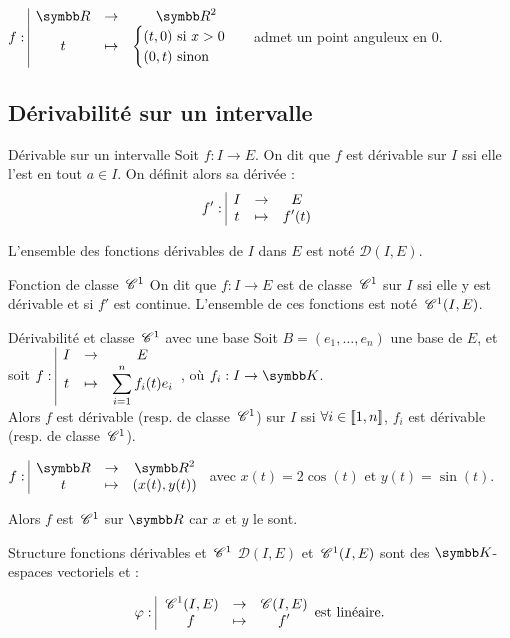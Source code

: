 \begin{exemple}
    $\fonction f \R {\R^2} t {\begin{cases} (t, 0)~\text{si}~x > 0\\(0,t)~\text{sinon}\end{cases}}$ admet un point anguleux en $0$.
\end{exemple}

\subsection{Dérivabilité sur un intervalle}

\begin{definition}{Dérivable sur un intervalle}{}
    Soit $f : I \to E$. On dit que $f$ est dérivable sur $I$ ssi elle l'est en tout $a \in I$. 
    On définit alors sa dérivée :
    \[f': \space \begin{array}{|ccc} \displaystyle I & \to & \displaystyle E \\ \displaystyle t & \mapsto & \displaystyle f'(t) \end{array}\] 

    L'ensemble des fonctions dérivables de $I$ dans $E$ est noté $\mathscr D(I, E)$.
\end{definition}

\begin{definition}{Fonction de classe $\,\mathscr C^{1} $}{}
    On dit que $f : I \to E$ est de classe $\,\mathscr C^{1} $ sur $I$ ssi 
    elle y est dérivable et si $f'$ est continue.
    L'ensemble de ces fonctions est noté $\,\mathscr C^{1} (I, E)$.
\end{definition}

\begin{proposition}{Dérivabilité et classe $\,\mathscr C^{1} $ avec une base }{}
    Soit $B = (e_1, \ldots, e_n)$ une base de $E$, et soit
    $\displaystyle f: \space \begin{array}{|ccc} \displaystyle I & \to & \displaystyle E \\ \displaystyle t & \mapsto & \displaystyle \sum_{i=1}^n f_i(t)e_i \end{array}$, où $f_i : I \to \K$. \\

    Alors $f$ est dérivable (resp. de classe $\,\mathscr C^{1} $) sur $I$ ssi
    $\forall i \in [\![1, n]\!]$, $f_i$ est dérivable (resp. de classe $\,\mathscr C^{1} $).
\end{proposition}

\begin{exemple}
    $\fonction{f}{\R}{\R^2}{t}{(x(t), y(t))}$ avec $x(t) = 2 \cos(t)$ et $y(t) = \sin(t)$.

    Alors $f$ est $\,\mathscr C^{1} $ sur $\R$ car $x$ et $y$ le sont.
\end{exemple}

\begin{proposition}{Structure fonctions dérivables et $\,\mathscr C^{1} $}{}
    $\mathscr D(I, E)$ et $\,\mathscr C^{1} (I, E)$ sont des $\K$-espaces vectoriels et :

    \[\varphi: \space \begin{array}{|ccc} \displaystyle \,\mathscr C^{1} (I, E) & \to & \displaystyle \mathscr C(I, E) \\ \displaystyle f & \mapsto & \displaystyle f' \end{array} \text{est linéaire.}\] 
\end{proposition}

